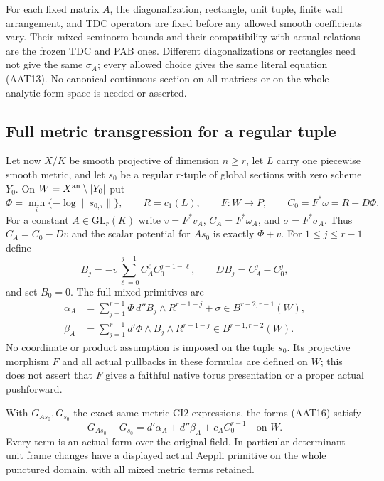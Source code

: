 For each fixed matrix $A$, the diagonalization, rectangle,
unit tuple, finite wall arrangement, and TDC operators
are fixed before any allowed smooth coefficients vary.
Their mixed seminorm bounds and their compatibility
with actual relations are the frozen TDC and PAB ones.
Different diagonalizations or rectangles need not give
the same $\sigma_A$; every allowed choice gives the
same literal equation (AAT13).  No canonical continuous
section on all matrices or on the whole analytic form
space is needed or asserted.

\subsection{Full metric transgression for a regular tuple}

Let now $X/K$ be smooth projective of dimension $n\ge r$,
let $L$ carry one piecewise smooth metric, and let $s_0$
be a regular $r$-tuple of global sections with zero
scheme $Y_0$.  On $W=X^{\rm an}\setminus|Y_0|$ put
\[
 \Phi=\min_i\{-\log\|s_{0,i}\|\},\qquad
 R=c_1(L),\qquad
 F:W\longrightarrow P,\qquad C_0=F^*\omega=R-D\Phi.
 \tag{AAT14}
\]
For a constant $A\in\mathrm{GL}_r(K)$ write
$v=F^*v_A$, $C_A=F^*\omega_A$, and $\sigma=F^*\sigma_A$.
Thus $C_A=C_0-Dv$ and the scalar potential for $As_0$
is exactly $\Phi+v$.  For $1\le j\le r-1$ define
\[
                  B_j=-v\sum_{\ell=0}^{j-1}
                                   C_A^\ell C_0^{j-1-\ell},
       \qquad DB_j=C_A^j-C_0^j,
 \tag{AAT15}
\]
and set $B_0=0$.  The full mixed primitives are
\[
 \begin{split}
 \alpha_A&=\sum_{j=1}^{r-1}
                     \Phi\,d''B_j\wedge R^{r-1-j}+\sigma
                      \in B^{r-2,r-1}(W),\\
 \beta_A&=\sum_{j=1}^{r-1}
                     d'\Phi\wedge B_j\wedge R^{r-1-j}
                      \in B^{r-1,r-2}(W).
 \end{split}
 \tag{AAT16}
\]
No coordinate or product assumption is imposed on the
tuple $s_0$.  Its projective morphism $F$ and all actual
pullbacks in these formulas are defined on $W$; this
does not assert that $F$ gives a faithful native torus
presentation or a proper actual pushforward.

\begin{theorem}
\label{thm:r9-actual-determinant-transgression}
With $G_{As_0},G_{s_0}$ the exact same-metric CI2
expressions, the forms (AAT16) satisfy
\[
       G_{As_0}-G_{s_0}
              =d'\alpha_A+d''\beta_A+c_A C_0^{r-1}
                                             \quad\text{on }W.
 \tag{AAT17}
\]
Every term is an actual form over the original field.
In particular determinant-unit frame changes have a
displayed actual Aeppli primitive on the whole punctured
domain, with all mixed metric terms retained.
\end{theorem}

